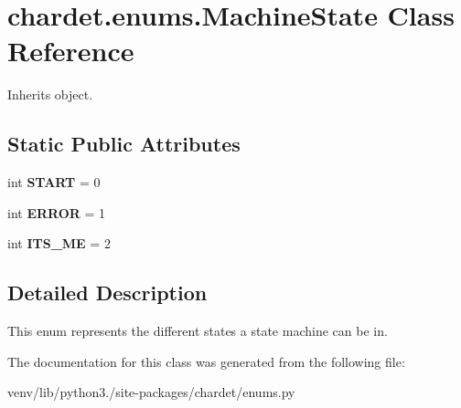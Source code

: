 \hypertarget{classchardet_1_1enums_1_1_machine_state}{}\section{chardet.\+enums.\+Machine\+State Class Reference}
\label{classchardet_1_1enums_1_1_machine_state}


Inherits object.

\subsection*{Static Public Attributes}
\begin{DoxyCompactItemize}
\item 
\mbox{\label{classchardet_1_1enums_1_1_machine_state_a339ad1f56d664151eb4bf1c475fedab6}} 
int {\bfseries S\+T\+A\+RT} = 0
\item 
\mbox{\label{classchardet_1_1enums_1_1_machine_state_a9d64d3ab41d84a0a47009592e57a8f6d}} 
int {\bfseries E\+R\+R\+OR} = 1
\item 
\mbox{\label{classchardet_1_1enums_1_1_machine_state_a05f30fcc8e5673ddc3d64ae53070a327}} 
int {\bfseries I\+T\+S\+\_\+\+ME} = 2
\end{DoxyCompactItemize}


\subsection{Detailed Description}
\begin{DoxyVerb}This enum represents the different states a state machine can be in.
\end{DoxyVerb}
 

The documentation for this class was generated from the following file\+:\begin{DoxyCompactItemize}
\item 
venv/lib/python3./site-\/packages/chardet/enums.\+py\end{DoxyCompactItemize}
